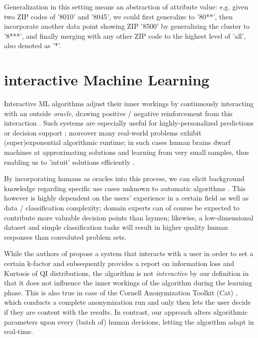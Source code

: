 \documentclass{llncs}
\begin{document}
Generalization in this setting means an abstraction of attribute value: e.g. given two ZIP codes of '8010' and '8045', we could first generalize to '80**', then incorporate another data point showing ZIP '8500' by generalizing the cluster to '8***', and finally merging with any other ZIP code to the highest level of 'all', also denoted as '*'.


\section{interactive Machine Learning}
\label{sect:iML}

Interactive ML algorithms adjust their inner workings by continuously interacting with an outside \textit{oracle}, drawing positive / negative reinforcement from this interaction \cite{Holzinger:2016:iML}. Such systems are especially useful for highly-personalized predictions or decision support \cite{Kieseberg:2016:Doctor-in-the-Loop}; moreover many real-world problems exhibit (super)exponential algorithmic runtime; in such cases human brains dwarf machines at approximating solutions and learning from very small samples, thus enabling us to 'intuit' solutions efficiently \cite{iMLExperiment}.

By incorporating humans as oracles into this process, we can elicit background knowledge regarding specific use cases unknown to automatic algorithms \cite{WARE2001}. This however is highly dependent on the users' experience in a certain field as well as data / classification complexity; domain experts can of course be expected to contribute more valuable decision points than laymen; likewise, a low-dimensional dataset and simple classification tasks will result in higher quality human responses than convoluted problem sets.

While the authors of \cite{Moque2012} propose a system that interacts with a user in order to set a certain k-factor and subsequently provides a report on information loss and Kurtosis of QI distributions, the algorithm is not \textit{interactive} by our definition in that it does not influence the inner workings of the algorithm during the learning phase. This is also true in case of the Cornell Anonymization Toolkit (Cat) \cite{Xiao2009}, which conducts a complete anonymization run and only then lets the user decide if they are content with the results. In contrast, our approach alters algorithmic parameters upon every (batch of) human decisions, letting the algorithm adapt in real-time.
\end{document}
